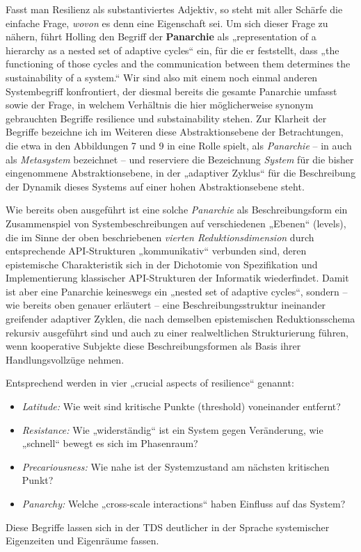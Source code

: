 \documentclass[11pt,a4paper]{article}
\begin{document}
Fasst man Resilienz als substantiviertes Adjektiv, so steht mit aller Schärfe
die einfache Frage, \emph{wovon} es denn eine Eigenschaft sei.  Um sich dieser
Frage zu nähern, führt Holling den Begriff der \textbf{Panarchie} als
„representation of a hierarchy as a nested set of adaptive cycles“ ein, für
die er feststellt, dass „the functioning of those cycles and the communication
between them determines the sustainability of a system.“ Wir sind also mit
einem noch einmal anderen Systembegriff konfrontiert, der diesmal bereits die
gesamte Panarchie umfasst sowie der Frage, in welchem Verhältnis die hier
möglicherweise synonym gebrauchten Begriffe resilience und substainability
stehen. Zur Klarheit der Begriffe bezeichne ich im Weiteren diese
Abstraktionsebene der Betrachtungen, die etwa in den Abbildungen 7 und 9 in
\cite{Holling2000} eine Rolle spielt, als \emph{Panarchie} -- in
\cite{Brand2007} auch als \emph{Metasystem} bezeichnet -- und reserviere die
Bezeichnung \emph{System} für die bisher eingenommene Abstraktionsebene, in
der „adaptiver Zyklus“ für die Beschreibung der Dynamik dieses Systems auf
einer hohen Abstraktionsebene steht.

Wie bereits oben ausgeführt ist eine solche \emph{Panarchie} als
Beschreibungsform ein Zusammenspiel von Systembeschreibungen auf verschiedenen
„Ebenen“ (levels), die im Sinne der oben beschriebenen \emph{vierten
  Reduktionsdimension} durch entsprechende API-Strukturen „kommunikativ“
verbunden sind, deren epistemische Charakteristik sich in der Dichotomie von
Spezifikation und Implementierung klassischer API-Strukturen der Informatik
wiederfindet. Damit ist aber eine Panarchie keineswegs ein „nested set of
adaptive cycles“, sondern -- wie bereits oben genauer erläutert -- eine
Beschreibungsstruktur ineinander greifender adaptiver Zyklen, die nach
demselben epistemischen Reduktionsschema rekursiv ausgeführt sind und auch zu
einer realweltlichen Strukturierung führen, wenn kooperative Subjekte diese
Beschreibungsformen als Basis ihrer Handlungsvollzüge nehmen.

Entsprechend werden in \cite{Walker2004} vier „crucial aspects of resilience“
genannt:
\begin{itemize}[noitemsep]
\item \emph{Latitude:} Wie weit sind kritische Punkte (threshold) voneinander
  entfernt?
\item \emph{Resistance:} Wie „widerständig“ ist ein System gegen Veränderung,
  wie „schnell“ bewegt es sich im Phasenraum?
\item \emph{Precariousness:} Wie nahe ist der Systemzustand am nächsten
  kritischen Punkt?
\item \emph{Panarchy:} Welche „cross-scale interactions“ haben Einfluss auf
  das System?
\end{itemize}
Diese Begriffe lassen sich in der TDS deutlicher in der Sprache systemischer
Eigenzeiten und Eigenräume fassen.
\end{document}
